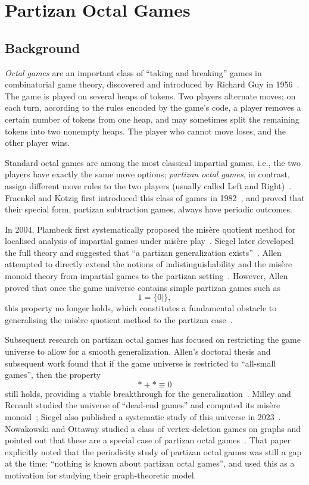 \documentclass[11pt]{article}
\theoremstyle{definition}
\theoremstyle{plain}
\begin{document}
\section{Partizan Octal Games}
\subsection{Background}

\textit{Octal games} are an important class of ``taking and breaking'' games in combinatorial game theory, discovered and introduced by Richard Guy in 1956~\cite{Octal1956}.
The game is played on several heaps of tokens. Two players alternate moves; on each turn, according to the rules encoded by the game's code, a player removes a certain number of tokens from one heap, and may sometimes split the remaining tokens into two nonempty heaps.
The player who cannot move loses, and the other player wins.

Standard octal games are among the most classical impartial games, i.e., the two players have exactly the same move options;
\textit{partizan octal games}, in contrast, assign different move rules to the two players (usually called Left and Right)~\cite{Part1976}.
Fraenkel and Kotzig first introduced this class of games in 1982~\cite{PartOctal1987}, and proved that their special form, partizan subtraction games, always have periodic outcomes.

In 2004, Plambeck first systematically proposed the misère quotient method for localised analysis of impartial games under misère play~\cite{MisQuot2006}.
Siegel later developed the full theory and suggested that ``a partizan generalization exists''~\cite{PartMisQuot2007}.
Allen attempted to directly extend the notions of indistinguishability and the misère monoid theory from impartial games to the partizan setting~\cite{PartMis2010}.
However, Allen proved that once the game universe contains simple partizan games such as
\[
    1 = \{0 \mid \},
\]
this property no longer holds, which constitutes a fundamental obstacle to generalising the misère quotient method to the partizan case~\cite{PartMisQuot2015}.

Subsequent research on partizan octal games has focused on restricting the game universe to allow for a smooth generalization.
Allen's doctoral thesis and subsequent work found that if the game universe is restricted to ``all-small games'', then the property
\[
    *+* \equiv 0
\]
still holds, providing a viable breakthrough for the generalization~\cite{PartMisQuot2015}.
Milley and Renault studied the universe of ``dead-end games'' and computed its misère monoid~\cite{PartMisQuot2013};
Siegel also published a systematic study of this universe in 2023~\cite{PartMisQuot2023}.
Nowakowski and Ottaway studied a class of vertex-deletion games on graphs and pointed out that these are a special case of partizan octal games~\cite{VertexDel2013}.
That paper explicitly noted that the periodicity study of partizan octal games was still a gap at the time:
``nothing is known about partizan octal games'', and used this as a motivation for studying their graph-theoretic model.
\end{document}
